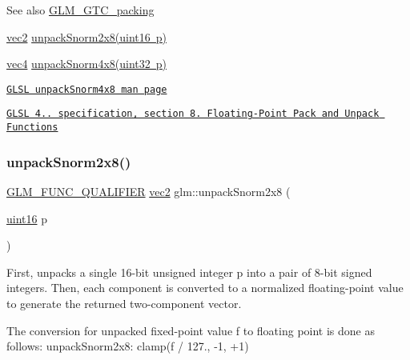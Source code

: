 \begin{DoxySeeAlso}{See also}
\mbox{\hyperlink{group__gtc__packing}{G\+L\+M\+\_\+\+G\+T\+C\+\_\+packing}} 

\mbox{\hyperlink{group__core__types_gaa1618f51db67eaa145db101d8c8431d8}{vec2}} \mbox{\hyperlink{group__gtc__packing_ga27f30f0281b88e152b0895f5e2ead878}{unpack\+Snorm2x8(uint16 p)}} 

\mbox{\hyperlink{group__core__types_ga5881b1b022d7fd1b7218f5916532dd02}{vec4}} \mbox{\hyperlink{group__core__func__packing_ga2db488646d48b7c43d3218954523fe82}{unpack\+Snorm4x8(uint32 p)}} 

\href{http://www.opengl.org/sdk/docs/manglsl/xhtml/unpackSnorm4x8.xml}{\tt G\+L\+SL unpack\+Snorm4x8 man page} 

\href{http://www.opengl.org/registry/doc/GLSLangSpec.4.20.8.pdf}{\tt G\+L\+SL 4.. specification, section 8. Floating-\/\+Point Pack and Unpack Functions} 
\end{DoxySeeAlso}
\mbox{\label{group__gtc__packing_ga27f30f0281b88e152b0895f5e2ead878}} 
\subsubsection{\texorpdfstring{unpack\+Snorm2x8()}{unpackSnorm2x8()}}
{\footnotesize\ttfamily \mbox{\hyperlink{setup_8hpp_a33fdea6f91c5f834105f7415e2a64407}{G\+L\+M\+\_\+\+F\+U\+N\+C\+\_\+\+Q\+U\+A\+L\+I\+F\+I\+ER}} \mbox{\hyperlink{group__core__types_gaa1618f51db67eaa145db101d8c8431d8}{vec2}} glm\+::unpack\+Snorm2x8 (\begin{DoxyParamCaption}\item[{\mbox{\hyperlink{group__gtc__type__precision_gad8c2939e1fdd8e5828b31d95c52255d5}{uint16}}}]{p }\end{DoxyParamCaption})}

First, unpacks a single 16-\/bit unsigned integer p into a pair of 8-\/bit signed integers. Then, each component is converted to a normalized floating-\/point value to generate the returned two-\/component vector.

The conversion for unpacked fixed-\/point value f to floating point is done as follows\+: unpack\+Snorm2x8\+: clamp(f / 127., -\/1, +1)

